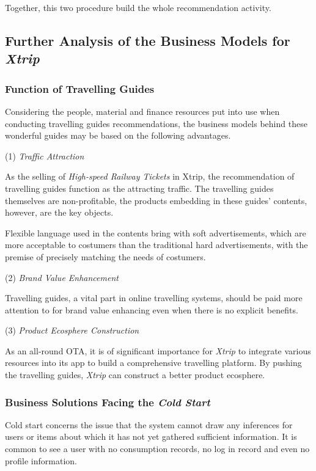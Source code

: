 \documentclass{article}
\begin{document}
	Together, this two procedure build the whole recommendation activity.
    
    \subsection{Further Analysis of the Business Models for \emph{Xtrip}}
    \subsubsection{Function of Travelling Guides}
    Considering the people, material and finance resources put into use when conducting travelling guides recommendations, the business models behind these wonderful guides may be based on the following advantages.

    (1) \emph{Traffic Attraction}

    As the selling of \emph{High-speed Railway Tickets} in Xtrip, the recommendation of travelling guides function as the attracting traffic. The travelling guides themselves are non-profitable, the products embedding in these guides' contents, however, are the key objects. 

    Flexible language used in the contents bring with soft advertisements, which are more acceptable to costumers than the traditional hard advertisements, with the premise of precisely matching the needs of costumers.

    (2) \emph{Brand Value Enhancement}

    Travelling guides, a vital part in online travelling systems, should be paid more attention to for brand value enhancing even when there is no explicit benefits. 

    (3) \emph{Product Ecosphere Construction}

    As an all-round OTA, it is of significant importance for \emph{Xtrip} to integrate various resources into its app to build a comprehensive travelling platform. By pushing the travelling guides, \emph{Xtrip} can construct a better product ecosphere.

    \subsubsection{Business Solutions Facing the \emph{Cold Start}}
    Cold start concerns the issue that the system cannot draw any inferences for users or items about which it has not yet gathered sufficient information. It is common to see a user with no consumption records, no log in record and even no profile information. 
\end{document}
